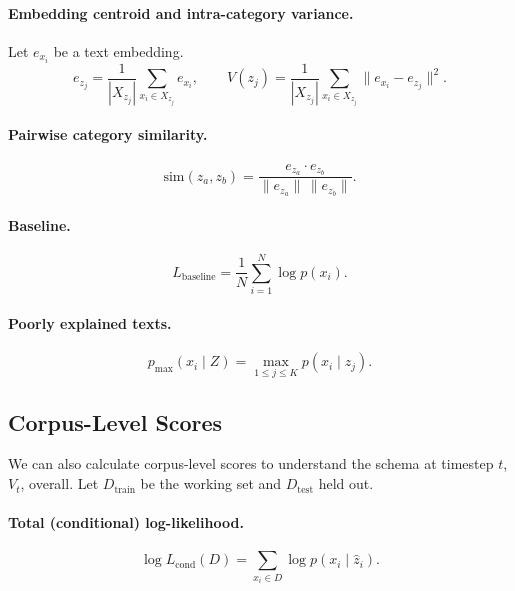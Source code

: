 \documentclass[11pt]{article}
\begin{document}
\paragraph{Embedding centroid and intra-category variance.}
Let $e_{x_i}$ be a text embedding.
\begin{equation}
e_{z_j} = \frac{1}{|X_{z_j}|} \sum_{x_i \in X_{z_j}} e_{x_i},
\qquad
V(z_j) = \frac{1}{|X_{z_j}|} \sum_{x_i \in X_{z_j}} \|e_{x_i} - e_{z_j}\|^2. \tag{6}
\end{equation}

\paragraph{Pairwise category similarity.}
\begin{equation}
\mathrm{sim}(z_a, z_b) = \frac{e_{z_a} \cdot e_{z_b}}{\|e_{z_a}\|\, \|e_{z_b}\|}. \tag{7}
\end{equation}

\paragraph{Baseline.}
\begin{equation}
L_{\mathrm{baseline}} = \frac{1}{N} \sum_{i=1}^N \log p(x_i). \tag{8}
\end{equation}

\paragraph{Poorly explained texts.}
\begin{equation}
p_{\max}(x_i \mid Z) = \max_{1 \le j \le K} p(x_i \mid z_j). \tag{9}
\end{equation}

\subsection{Corpus-Level Scores}
We can also calculate corpus-level scores to understand the schema at timestep $t$, $V_t$, overall. Let $D_{\mathrm{train}}$ be the working set and $D_{\mathrm{test}}$ held out.

\paragraph{Total (conditional) log-likelihood.}
\begin{equation}
\log L_{\mathrm{cond}}(D) = \sum_{x_i \in D} \log p\!\left(x_i \mid \hat{z}_i\right). \tag{10}
\end{equation}
\end{document}
